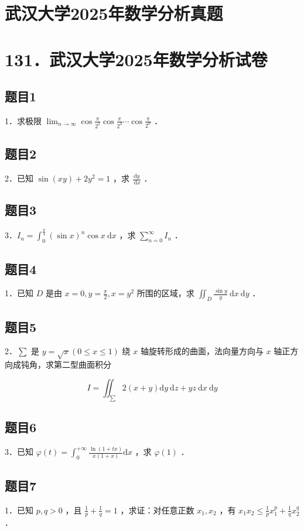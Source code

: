 \documentclass{article}
\begin{document}
\section*{武汉大学2025年数学分析真题}
\section*{131．武汉大学2025年数学分析试卷}

\subsection{题目1}
1．求极限 \(\lim _{n \rightarrow \infty} \cos \frac{\pi}{2^{2}} \cos \frac{\pi}{2^{3}} \cdots \cos \frac{\pi}{2^{n}}\) ．

\subsection{题目2}
2．已知 \(\sin (x y)+2 y^{2}=1\) ，求 \(\frac{\mathrm{d} y}{\mathrm{~d} x}\) ．

\subsection{题目3}
3．\(I_{n}=\int_{0}^{\frac{\pi}{4}}(\sin x)^{n} \cos x \mathrm{~d} x\) ，求 \(\sum_{n=0}^{\infty} I_{n}\) ．

\subsection{题目4}
1．已知 \(D\) 是由 \(x=0, y=\frac{\pi}{2}, x=y^{2}\) 所围的区域，求 \(\iint_{D} \frac{\sin y}{y} \mathrm{~d} x \mathrm{~d} y\) ．

\subsection{题目5}
2．\(\sum\) 是 \(y=\sqrt{x}(0 \leq x \leq 1)\) 绕 \(x\) 轴旋转形成的曲面，法向量方向与 \(x\) 轴正方向成钝角，求第二型曲面积分

\[
I=\iint_{\sum} 2(x+y) \mathrm{d} y \mathrm{~d} z+y z \mathrm{~d} x \mathrm{~d} y
\]

\subsection{题目6}
3．已知 \(\varphi(t)=\int_{0}^{+\infty} \frac{\ln (1+t x)}{x(1+x)} \mathrm{d} x\) ，求 \(\varphi(1)\) ．

\subsection{题目7}
1．已知 \(p, q>0\) ，且 \(\frac{1}{p}+\frac{1}{q}=1\) ，求证：对任意正数 \(x_{1}, x_{2}\) ，有 \(x_{1} x_{2} \leq \frac{1}{p} x_{1}^{p}+\frac{1}{q} x_{2}^{q}\) ．
\end{document}
